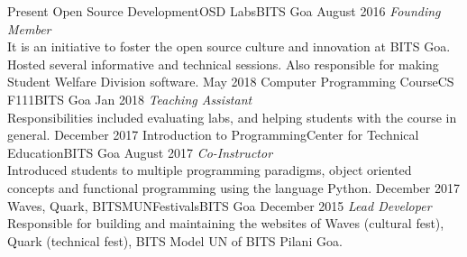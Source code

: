 %
%
%
\begin{experiences}
 \researchexperience
    {Present}   {Open Source Development}{OSD Labs}{BITS Goa}
    {August 2016} {\textit{Founding Member}\\
    It is an initiative to foster the open source culture and innovation at BITS Goa. Hosted several informative and technical sessions. Also responsible for making Student Welfare Division software.                                                        
                    }
  \emptySeparator
   \researchexperience
    {May 2018}   {Computer Programming Course}{CS F111}{BITS Goa}
    {Jan 2018} {\textit{Teaching Assistant}\\
    Responsibilities included evaluating labs, and helping students with the course in general.                                                   
                    }
  \emptySeparator
  \researchexperience
    {December 2017}   {Introduction to Programming}{Center for Technical Education}{BITS Goa}
    {August 2017} {\textit{Co-Instructor}\\
    Introduced students to multiple programming paradigms, object oriented
concepts and functional programming using the language Python.                                                   
                    }
  \emptySeparator
  \researchexperience
    {December 2017}   {Waves, Quark, BITSMUN}{Festivals}{BITS Goa}
    {December 2015} {\textit{Lead Developer}\\
    Responsible for building and maintaining the websites of {Waves} (cultural fest),  {Quark} (technical fest),  BITS Model UN of BITS Pilani Goa.                                                   
                    }
  \emptySeparator
\end{experiences}
\vspace{-3mm}
